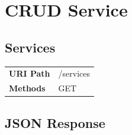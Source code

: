 \documentclass[11pt]{scrartcl}
\begin{document}
\newpage

\section{CRUD Service}
\subsection{Services}
\begin{tabularx}{\linewidth}{l l}
\textbf{URI Path} & /services\\
\textbf{Methods} & GET\\
\end{tabularx}

\subsection{JSON Response}
\end{document}
